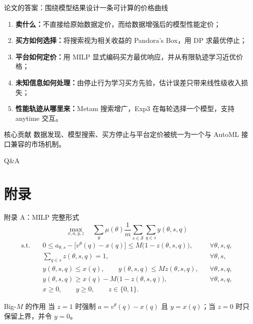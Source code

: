 \documentclass[10pt,aspectratio=169]{beamer}
\newcommand{\key}[1]{\textcolor{ZJUBlue}{\textbf{#1}}}
\begin{document}
\begin{frame}{论文的答案：围绕模型结果设计一条可计算的价格曲线}
  \begin{enumerate}
    \item \key{卖什么：}不直接给原始数据定价，而给数据增强后的模型性能定价；
    \item \key{买方如何选择：}将搜索视为相关收益的 Pandora's Box，用 DP 求最优停止；
    \item \key{平台如何定价：}用 MILP 显式编码买方最优响应，并从有限轨迹学习近优价格；
    \item \key{未知信息如何处理：}由停止行为学习买方先验，估计误差只带来线性级收入损失；
    \item \key{性能轨迹从哪里来：}Metam 搜索增广，Exp3 在每轮选择一个模型，支持 anytime 交互。
  \end{enumerate}
  \vspace{0.6em}
  \begin{alertblock}{核心贡献}
    数据发现、模型搜索、买方停止与平台定价被统一为一个与 AutoML 接口兼容的市场机制。
  \end{alertblock}
  \vfill
  \centering\large Q\&A
\end{frame}

\appendix
\section*{附录}

\begin{frame}{附录 A：MILP 完整形式}
  \scriptsize
  \[
    \max_{x,a,y,z}\quad
    \sum_{\theta}\mu(\theta)\frac{1}{m}
    \sum_{s\in\mathcal S}\sum_{q\in s}y(\theta,s,q)
  \]
  \[
  \begin{aligned}
    \text{s.t.}\quad
    &0\le a_{\theta,s}-\bigl[v^\theta(q)-x(q)\bigr]
      \le M\bigl(1-z(\theta,s,q)\bigr), &&\forall\theta,s,q,\\
    &\sum_{q\in s}z(\theta,s,q)=1, &&\forall\theta,s,\\
    &y(\theta,s,q)\le x(q),\qquad
      y(\theta,s,q)\le Mz(\theta,s,q), &&\forall\theta,s,q,\\
    &y(\theta,s,q)\ge x(q)-M\bigl(1-z(\theta,s,q)\bigr), &&\forall\theta,s,q,\\
    &x\ge0,\qquad y\ge0,\qquad z\in\{0,1\}.&
  \end{aligned}
  \]
  \begin{block}{Big-$M$ 的作用}
    当 $z=1$ 时强制 $a=v^\theta(q)-x(q)$ 且 $y=x(q)$；当 $z=0$ 时只保留上界，并令 $y=0$。
  \end{block}
\end{frame}
\end{document}
